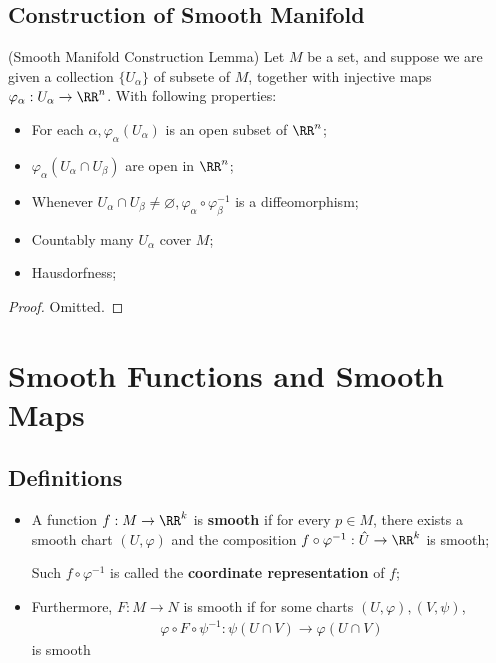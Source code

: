 \documentclass[Total.tex]{subfiles}
\begin{document}
			\subsection{Construction of Smooth Manifold}
			\begin{lemma}
				(Smooth Manifold Construction Lemma) Let $M$ be a set, and suppose we are given a collection $\{U_\alpha\}$ of subsete of $M$, together with injective maps $\varphi_\alpha:U_\alpha\rightarrow \RR^n$. With following properties:
				\begin{itemize}
					\item For each $\alpha,\varphi_\alpha(U_\alpha)$ is an open subset of $\RR^n$;
					\item $\varphi_\alpha(U_\alpha\cap U_\beta)$ are open in $\RR^n$;
					\item Whenever $U_\alpha\cap U_\beta\not=\varnothing,\varphi_\alpha\circ \varphi_\beta^{-1}$ is a diffeomorphism;
					\item Countably many $U_\alpha$ cover $M$;
					\item Hausdorfness;
				\end{itemize}
			\end{lemma}
			\begin{proof}
				Omitted.
			\end{proof}
		\section{Smooth Functions and Smooth Maps}
			\subsection{Definitions}
			\begin{Def}
				\begin{itemize}
					\item A function $f:M\rightarrow \RR^k$ is \textbf{smooth} if for every $p\in M$, there exists a smooth chart $(U,\varphi)$ and the composition $f\circ \varphi^{-1}:\hat{U}\rightarrow \RR^k$ is smooth;
					
					Such $f\circ \varphi^{-1}$ is called the \textbf{coordinate representation} of $f$;
					\item Furthermore, $F:M\rightarrow N$ is smooth if for some charts $(U,\varphi),(V,\psi)$,
					\begin{gather*}
						\varphi\circ F\circ \psi^{-1}:\psi(U\cap V)\rightarrow \varphi(U\cap V)
					\end{gather*}
					is smooth
				\end{itemize}
			\end{Def}
			
\end{document}
